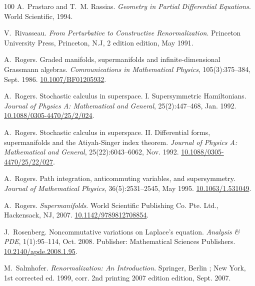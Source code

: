 \documentclass[11pt]{article}
\newcommand{\tmtextit}[1]{{\itshape{#1}}}
\begin{document}
\begin{thebibliography}{100}
  A.~Prastaro and T.~M. Rassias.
  {\newblock}\tmtextit{Geometry in Partial Differential Equations}.
  {\newblock}World Scientific, 1994.
  
  V.~Rivasseau.
  {\newblock}\tmtextit{From Perturbative to Constructive Renormalization}.
  {\newblock}Princeton University Press, Princeton, N.J, 2 edition edition,
  May 1991.
  
  A.~Rogers. {\newblock}Graded manifolds,
  supermanifolds and infinite-dimensional Grassmann algebras.
  {\newblock}\tmtextit{Communications in Mathematical Physics},
  105(3):375--384, Sept. 1986.
  {\newblock}\href{https://doi.org/10.1007/BF01205932}{10.1007/BF01205932}.
  
  A.~Rogers. {\newblock}Stochastic
  calculus in superspace. I. Supersymmetric Hamiltonians.
  {\newblock}\tmtextit{Journal of Physics A: Mathematical and General},
  25(2):447--468, Jan. 1992. {\newblock}
  \href{https://doi.org/10.1088/0305-4470/25/2/024}{10.1088/0305-4470/25/2/024}.
  
  A.~Rogers. {\newblock}Stochastic
  calculus in superspace. II. Differential forms, supermanifolds and the
  Atiyah-Singer index theorem. {\newblock}\tmtextit{Journal of Physics A:
  Mathematical and General}, 25(22):6043--6062, Nov. 1992. {\newblock}
  \href{https://doi.org/10.1088/0305-4470/25/22/027}{10.1088/0305-4470/25/22/027}.
  
  A.~Rogers. {\newblock}Path integration,
  anticommuting variables, and supersymmetry. {\newblock}\tmtextit{Journal of
  Mathematical Physics}, 36(5):2531--2545, May 1995.
  {\newblock}\href{https://doi.org/10.1063/1.531049}{10.1063/1.531049}.
  
  A.~Rogers. {\newblock}\tmtextit{Supermanifolds}.
  {\newblock}World Scientific Publishing Co. Pte. Ltd., Hackensack, NJ, 2007.
  {\newblock}\href{https://doi.org/10.1142/9789812708854}{10.1142/9789812708854}.
  
  J.~Rosenberg.
  {\newblock}Noncommutative variations on Laplace's equation.
  {\newblock}\tmtextit{Analysis \& PDE}, 1(1):95--114, Oct. 2008.
  {\newblock}Publisher: Mathematical Sciences Publishers.
  \href{https://doi.org/10.2140/apde.2008.1.95}{10.2140/apde.2008.1.95}.
  
  M.~Salmhofer.
  {\newblock}\tmtextit{Renormalization: An Introduction}. {\newblock}Springer,
  Berlin ; New York, 1st corrected ed. 1999, corr. 2nd printing 2007 edition
  edition, Sept. 2007.
  

\end{thebibliography}
\end{document}
